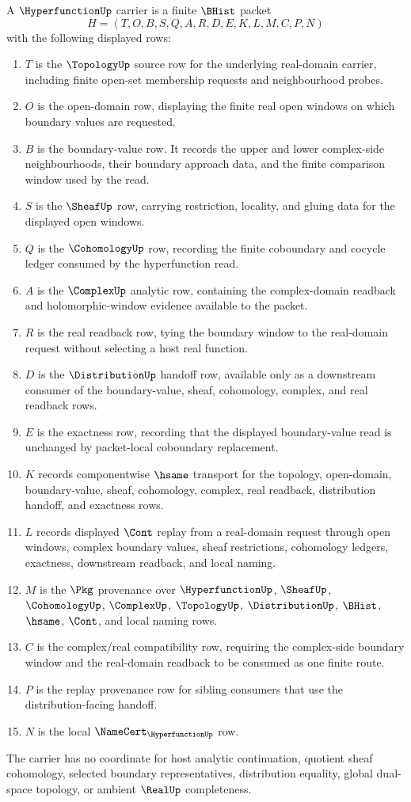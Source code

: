 \begin{definition}
\label{def:hyperfunction-carrier}
A $\HyperfunctionUp$ carrier is a finite $\BHist$ packet
$$
H=(T,O,B,S,Q,A,R,D,E,K,L,M,C,P,N)
$$
with the following displayed rows:
\begin{enumerate}
\item $T$ is the $\TopologyUp$ source row for the underlying real-domain carrier, including finite open-set membership requests and neighbourhood probes.
\item $O$ is the open-domain row, displaying the finite real open windows on which boundary values are requested.
\item $B$ is the boundary-value row. It records the upper and lower complex-side neighbourhoods, their boundary approach data, and the finite comparison window used by the read.
\item $S$ is the $\SheafUp$ row, carrying restriction, locality, and gluing data for the displayed open windows.
\item $Q$ is the $\CohomologyUp$ row, recording the finite coboundary and cocycle ledger consumed by the hyperfunction read.
\item $A$ is the $\ComplexUp$ analytic row, containing the complex-domain readback and holomorphic-window evidence available to the packet.
\item $R$ is the real readback row, tying the boundary window to the real-domain request without selecting a host real function.
\item $D$ is the $\DistributionUp$ handoff row, available only as a downstream consumer of the boundary-value, sheaf, cohomology, complex, and real readback rows.
\item $E$ is the exactness row, recording that the displayed boundary-value read is unchanged by packet-local coboundary replacement.
\item $K$ records componentwise $\hsame$ transport for the topology, open-domain, boundary-value, sheaf, cohomology, complex, real readback, distribution handoff, and exactness rows.
\item $L$ records displayed $\Cont$ replay from a real-domain request through open windows, complex boundary values, sheaf restrictions, cohomology ledgers, exactness, downstream readback, and local naming.
\item $M$ is the $\Pkg$ provenance over $\HyperfunctionUp$, $\SheafUp$, $\CohomologyUp$, $\ComplexUp$, $\TopologyUp$, $\DistributionUp$, $\BHist$, $\hsame$, $\Cont$, and local naming rows.
\item $C$ is the complex/real compatibility row, requiring the complex-side boundary window and the real-domain readback to be consumed as one finite route.
\item $P$ is the replay provenance row for sibling consumers that use the distribution-facing handoff.
\item $N$ is the local $\NameCert_{\HyperfunctionUp}$ row.
\end{enumerate}
The carrier has no coordinate for host analytic continuation, quotient sheaf cohomology, selected boundary representatives, distribution equality, global dual-space topology, or ambient $\RealUp$ completeness.
\end{definition}
